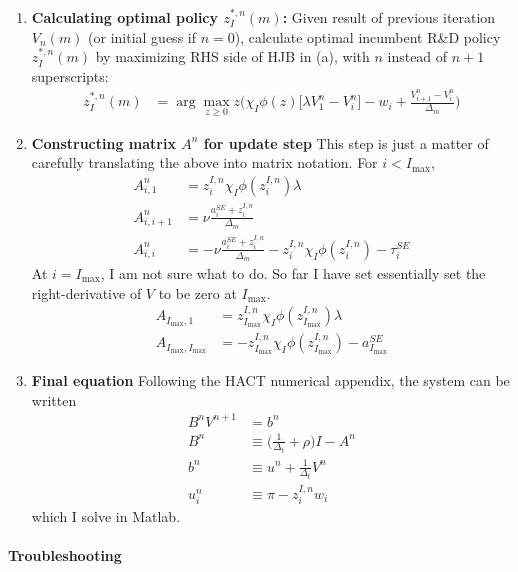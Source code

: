 \documentclass[12pt,english]{article}
\theoremstyle{remark}
\begin{document}
\begin{enumerate}
\begin{enumerate}
		\item \textbf{Calculating optimal policy $z_I^{*,n}(m)$:} Given result of previous iteration $V_n(m)$ (or initial guess if $n = 0$), calculate optimal incumbent R\&D policy $z_I^{*,n}(m)$ by maximizing RHS side of HJB in (a), with $n$ instead of $n+1$ superscripts:
		\begin{align*}
			z_I^{*,n} (m) &= \arg \max_{z \ge 0}  z \Big( \chi_I \phi(z) \big[ \lambda V^n_1 - V^n_i \big] - w_i + \frac{V_{i+1}^n - V_i^n}{\Delta_m} \Big)
		\end{align*} 
		\item \textbf{Constructing matrix $A^n$ for update step} This step is just a matter of carefully translating the above into matrix notation. For $i < I_{\max}$, 
		\begin{align*}
			A_{i,1}^n &= z^{I,n}_i \chi_I \phi(z^{I,n}_i) \lambda \\
			A_{i,i+1}^n &= \nu \frac{a^{SE}_i + z^{I,n}_i}{\Delta_m} \\
			A_{i,i}^n &= -\nu \frac{a^{SE}_i + z^{I,n}_i}{\Delta_m} - z^{I,n}_i \chi_I \phi(z^{I,n}_i) - \tau^{SE}_i 
		\end{align*} 
		At $i = I_{\max}$, I am not sure what to do. So far I have set essentially set the right-derivative of $V$ to be zero at $I_{\max}$.
		\begin{align*}
			A_{I_{\max},1} &= z^{I,n}_{I_{\max}} \chi_I \phi(z^{I,n}_{I_{\max}}) \lambda \\
			A_{I_{\max},I_{\max}} &= - z^{I,n}_{I_{\max}} \chi_I \phi(z^{I,n}_{I_{\max}}) - a^{SE}_{I_{\max}}
		\end{align*}
		\item \textbf{Final equation} Following the HACT numerical appendix, the system can be written 
		\begin{align*}
			B^n V^{n+1} &= b^n \\
			B^n &\equiv \Big( \frac{1}{\Delta_t} + \rho \Big) I - A^n \\
			b^n &\equiv u^n + \frac{1}{\Delta_t} V^{n} \\
			u^n_i &\equiv \pi - z^{I,n}_i w_i 
		\end{align*}
		which I solve in Matlab.
	\end{enumerate}
\end{enumerate}

\paragraph{Troubleshooting}
\end{document}
